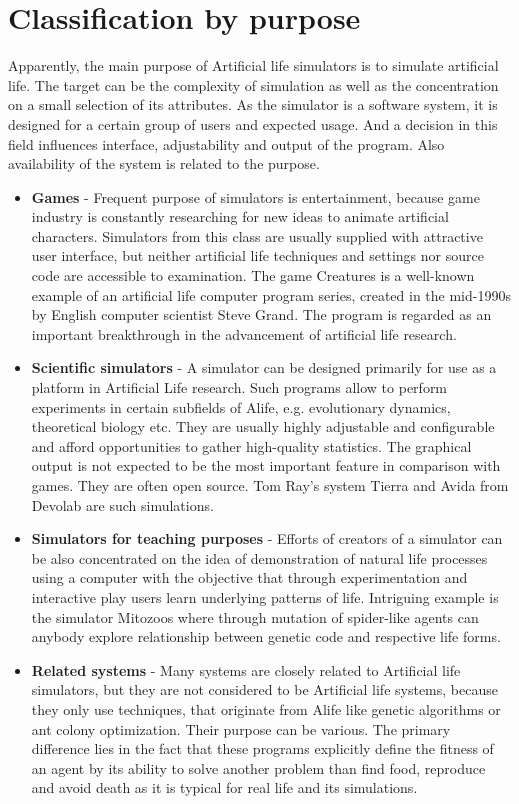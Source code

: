 \documentclass[a4paper,12pt]{report}
\begin{document}
\section{Classification by purpose}
Apparently, the main purpose of Artificial life simulators is to simulate artificial life. The target can be the complexity of simulation as well as the concentration on a small selection of its attributes. As the simulator is a software system, it is designed for a certain group of users and expected usage. And a decision in this field influences interface, adjustability and output of the program. Also availability of the system is related to the purpose. 
\begin{itemize}
  \item \textbf{Games} - Frequent purpose of simulators is entertainment, because game industry is constantly researching for new ideas to animate artificial characters. Simulators from this class are usually supplied with attractive user interface, but neither artificial life techniques and settings nor source code are accessible to examination. The game Creatures is a well-known example of an artificial life computer program series, created in the mid-1990s by English computer scientist Steve Grand. The program is regarded as an important breakthrough in the advancement of artificial life research.
  \item \textbf{Scientific simulators} - A simulator can be designed primarily for use as a platform in Artificial Life research. Such programs allow to perform experiments in certain subfields of Alife, e.g. evolutionary dynamics, theoretical biology etc. They are usually highly adjustable and configurable and afford opportunities to gather high-quality statistics. The graphical output is not expected to be the most important feature in comparison with games. They are often open source. Tom Ray's system Tierra and Avida from Devolab are such simulations. 
  \item \textbf{Simulators for teaching purposes} - Efforts of creators of a simulator can be also concentrated on the idea of demonstration of natural life processes using a computer with the objective that through experimentation and interactive play users learn underlying patterns of life. Intriguing example is the simulator Mitozoos where through mutation of spider-like agents can anybody explore relationship between genetic code and respective life forms. 
\item \textbf{Related systems} - Many systems are closely related to Artificial life simulators, but they are not considered to be Artificial life systems, because they only use techniques, that originate from Alife like genetic algorithms or ant colony optimization. Their purpose can be various. The primary difference lies in the fact that these programs explicitly define the fitness of an agent by its ability to solve another problem than find food, reproduce and avoid death as it is typical for real life and its simulations. 
\end{itemize}
\end{document}
